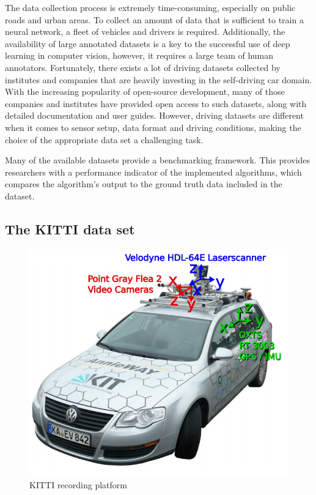 The data collection process is extremely time-consuming, especially on public roads and urban areas. To collect an amount of data that is sufficient to train a neural network, a fleet of vehicles and drivers is required. Additionally, the availability of large annotated datasets is a key to the successful use of deep learning in computer vision, however, it requires a large team of human annotators. Fortunately, there exists a lot of driving datasets collected by institutes and companies that are heavily investing in the self-driving car domain. With the increasing popularity of open-source development, many of those companies and institutes have provided open access to such datasets, along with detailed documentation and user guides. However, driving datasets are different when it comes to sensor setup, data format and driving conditions, making the choice of the appropriate data set a challenging task.

Many of the available datasets provide a benchmarking framework. This provides researchers with a performance indicator of the implemented algorithms, which compares the algorithm's output to the ground truth data included in the dataset.
\pagebreak
\subsection{The KITTI data set}
\begin{figure}
\includegraphics[width=\linewidth]{Figures/KITTI_platform.png}
\centering
\caption{KITTI recording platform \cite{kitti}}
\end{figure} 

